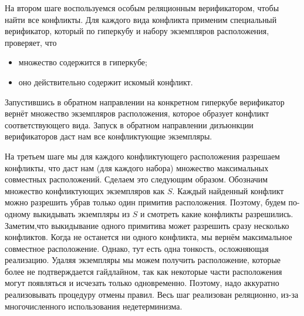 
На втором шаге воспользуемся особым реляционным верификатором, чтобы найти все конфликты. Для каждого вида конфликта применим
специальный верификатор, который по гиперкубу и набору экземпляров расположения, проверяет, что



\begin{itemize}
\item множество содержится в гиперкубе;
\item оно действительно содержит искомый конфликт.
\end{itemize}

Запустившись в обратном направлении на конкретном гиперкубе верификатор вернёт множество экземпляров расположения, которое образует конфликт соответствующего вида. Запуск в обратном направлении дизъюнкции верификаторов даст нам все конфликтующие экземпляры.


На третьем шаге мы для каждого конфликтующего расположения разрешаем конфликты, что даст нам (для каждого набора) множество максимальных совместных расположений.
Сделаем это следующим образом. Обозначим множество конфликтующих экземпляров как   $S$.
Каждый найденный конфликт можно разрешить убрав только один примитив расположения. Поэтому, будем по-одному выкидывать экземпляры из  $S$ и смотреть какие конфликты разрешились. Заметим,что выкидывание одного примитива может разрешить сразу несколько конфликтов.
Когда не останется ни одного конфликта, мы вернём максимальное совместное расположение. Однако, тут есть одна тонкость, осложняющая реализацию.
Удаляя экземпляры мы можем получить расположение, которые более не подтверждается гайдлайном, так как некоторые части расположения могут появляться и исчезать только одновременно. Поэтому, надо аккуратно реализовывать процедуру отмены правил. Весь шаг реализован реляционно, из-за многочисленного использования недетерминизма.


